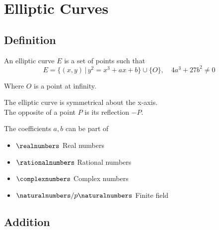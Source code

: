 \documentclass[a4paper]{article}
\author{Paolo Bettelini}
\date{}
\begin{document}
\maketitle
\tableofcontents
\pagebreak

\section{Elliptic Curves}

\subsection{Definition}

An elliptic curve \(E\) is a set of points such that
\[
    E=\{(x,y)\,|\,y^2=x^3+ax+b\}\cup\{O\},\quad 4a^3+27b^2\neq 0
\]

\begin{center}
\end{center}
Where \(O\) is a point at infinity.

The elliptic curve is symmetrical about the x-axis.\\
The opposite of a point \(P\) is its reflection \(-P\).

The coefficients \(a,b\) can be part of
\begin{itemize}
    \item \(\realnumbers\) Real numbers
    \item \(\rationalnumbers\) Rational numbers
    \item \(\complexnumbers\) Complex numbers
    \item \(\naturalnumbers/p\naturalnumbers\) Finite field
\end{itemize}

\subsection{Addition}
\end{document}
